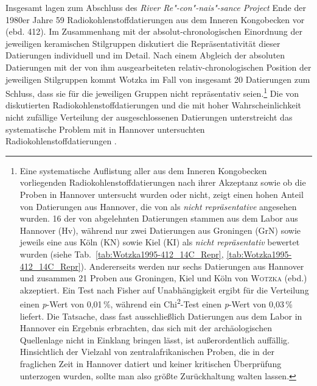 \begin{multicols}{2}
Insgesamt lagen zum Abschluss des \textit{River Re"-con"-nais"-sance Project} Ende der 1980er Jahre 59 Radiokohlenstoffdatierungen aus dem Inneren Kongobecken vor (ebd. 412). Im Zusammenhang mit der absolut-chronologischen Einordnung der jeweiligen keramischen Stilgruppen diskutiert \textcite{Wotzka.1995} die Repräsentativität dieser Datierungen individuell und im Detail. Nach einem Abgleich der absoluten Datierungen mit der von ihm ausgearbeiteten relativ-chronologischen Position der jeweiligen Stilgruppen kommt Wotzka im Fall von insgesamt 20 Datierungen zum Schluss, dass sie für die jeweiligen Gruppen nicht repräsentativ seien.\footnote{Eine systematische Auflistung aller aus dem Inneren Kongobecken vorliegenden Radiokohlenstoffdatierungen nach ihrer Akzeptanz sowie ob die Proben in Hannover untersucht wurden oder nicht, zeigt einen hohen Anteil von Datierungen aus Hannover, die von \textcites[132\,f.]{Eggert.1987c}[328 Anm.~20]{Eggert.1993}[67--210]{Wotzka.1995} als \textit{nicht repräsentative} angesehen wurden. 16 der von \textcite{Wotzka.1995} abgelehnten Datierungen stammen aus dem Labor aus Hannover (Hv), während nur zwei Datierungen aus Groningen (GrN) sowie jeweils eine aus Köln (KN) sowie Kiel (KI) als \textit{nicht repräsentativ} bewertet wurden (siehe Tab.~\ref{tab:Wotzka1995-412_14C_Repr}, \ref{tab:Wotzka1995-412_14C_Repr}). Andererseits werden nur sechs Datierungen aus Hannover und zusammen 21 Proben aus Groningen, Kiel und Köln von \textsc{Wotzka} (ebd.) akzeptiert. Ein Test nach Fisher auf Unabhängigkeit ergibt für die Verteilung einen \textit{p}-Wert von 0,01\,\%, während ein Chi\textsuperscript{2}-Test einen \textit{p}-Wert von 0,03\,\% liefert. Die Tatsache, dass fast ausschließlich Datierungen aus dem Labor in Hannover ein Ergebnis erbrachten, das sich mit der archäologischen Quellenlage nicht in Einklang bringen lässt, ist außerordentlich auffällig. Hinsichtlich der Vielzahl von zentralafrikanischen Proben, die in der fraglichen Zeit in Hannover datiert und keiner kritischen Überprüfung unterzogen wurden, sollte man also größte Zurückhaltung walten lassen.\label{ftn:c14Hannover}} Die von \textcite{Wotzka.1995} diskutierten Radiokohlenstoffdatierungen und die mit hoher Wahrscheinlichkeit nicht zufällige Verteilung der ausgeschlossenen Datierungen unterstreicht das systematische Problem mit in Hannover untersuchten Radiokohlenstoffdatierungen \parencite[siehe][]{Geyh.1990}.
 

\end{multicols}

